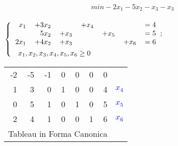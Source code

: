 \documentclass{article}
\begin{document}
        \begin{preview}
                \[
                    min - 2 x_1 - 5 x_2 - x_3 - x_3
                \]
                \paragraph{}
                \begin{math}
                        \begin{dcases}
                                \begin{tabular}{r r r r r r l}
                                        $ x_1 $   &  $ + 3 x_2 $ & & $ + x_4 $ & & & $ = 4 $ \\
                                        & $ 5 x_2 $ &  $ + x_3 $ & & $ + x_5 $ & & $ = 5 $ \\
                                        $ 2 x_1 $ &  $ + 4 x_2 $ & $ + x_3 $ & & & $ + x_6 $ & $ = 6 $
                                \end{tabular}; \\
                                \quad x_1, x_2, x_3, x_4, x_5, x_6 \geq{0}
                        \end{dcases}
                \end{math}
                \begin{center}
                        \begin{tabular}{|r r r r r r | r | r}
                                \cline{1-7}
                                -2 & -5 & -1 & 0 & 0 & 0 & 0 & \\
                                \cline{1-7}
                                1 & 3 & 0 & 1 & 0 & 0 & 4 & \textcolor{blue}{ $ x_4 $ } \\
                                0 & 5 & 1 & 0 & 1 & 0 & 5 & \textcolor{blue}{$ x_5 $ } \\
                                2 & 4 & 1 & 0 & 0 & 1 & 6 & \textcolor{blue}{$ x_6 $ } \\
                                \cline{1-7} \multicolumn{7}{r}{{\footnotesize Tableau in Forma Canonica}}
                        \end{tabular}
                \end{center}


\end{preview}
\end{document}
